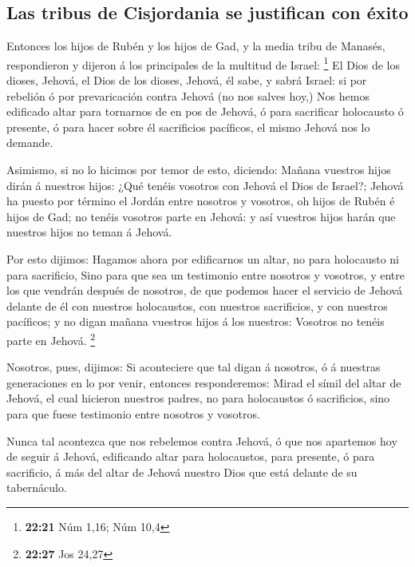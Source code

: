 \hypertarget{las-tribus-de-cisjordania-se-justifican-con-uxe9xito}{%
\subsection{Las tribus de Cisjordania se justifican con
éxito}\label{las-tribus-de-cisjordania-se-justifican-con-uxe9xito}}

 Entonces los hijos de Rubén y los hijos de Gad, y la media
tribu de Manasés, respondieron y dijeron á los principales de la
multitud de Israel: \footnote{\textbf{22:21} Núm 1,16; Núm 10,4}
 El Dios de los dioses, Jehová, el Dios de los dioses,
Jehová, él sabe, y sabrá Israel: si por rebelión ó por prevaricación
contra Jehová (no nos salves hoy,)  Nos hemos edificado
altar para tornarnos de en pos de Jehová, ó para sacrificar holocausto ó
presente, ó para hacer sobre él sacrificios pacíficos, el mismo Jehová
nos lo demande.

 Asimismo, si no lo hicimos por temor de esto, diciendo:
Mañana vuestros hijos dirán á nuestros hijos: ¿Qué tenéis vosotros con
Jehová el Dios de Israel?;  Jehová ha puesto por término el
Jordán entre nosotros y vosotros, oh hijos de Rubén é hijos de Gad; no
tenéis vosotros parte en Jehová: y así vuestros hijos harán que nuestros
hijos no teman á Jehová.

 Por esto dijimos: Hagamos ahora por edificarnos un altar,
no para holocausto ni para sacrificio,  Sino para que sea
un testimonio entre nosotros y vosotros, y entre los que vendrán después
de nosotros, de que podemos hacer el servicio de Jehová delante de él
con nuestros holocaustos, con nuestros sacrificios, y con nuestros
pacíficos; y no digan mañana vuestros hijos á los nuestros: Vosotros no
tenéis parte en Jehová. \footnote{\textbf{22:27} Jos 24,27}

 Nosotros, pues, dijimos: Si aconteciere que tal digan á
nosotros, ó á nuestras generaciones en lo por venir, entonces
responderemos: Mirad el símil del altar de Jehová, el cual hicieron
nuestros padres, no para holocaustos ó sacrificios, sino para que fuese
testimonio entre nosotros y vosotros.

 Nunca tal acontezca que nos rebelemos contra Jehová, ó que
nos apartemos hoy de seguir á Jehová, edificando altar para holocaustos,
para presente, ó para sacrificio, á más del altar de Jehová nuestro Dios
que está delante de su tabernáculo.

